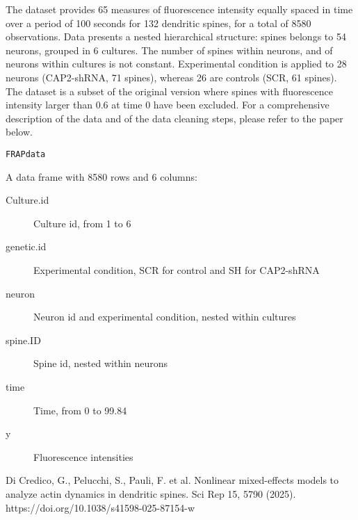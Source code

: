 \documentclass[a4paper]{book}
\begin{document}
%
\begin{Description}
The dataset provides 65 measures of fluorescence intensity equally spaced in time over a period of 100 seconds for 132 dendritic spines, for a total of 8580 observations.
Data presents a nested hierarchical structure: spines belongs to 54 neurons, grouped in 6 cultures.
The number of spines within neurons, and of neurons within cultures is not constant.
Experimental condition is applied to 28 neurons (CAP2-shRNA, 71 spines), whereas 26 are controls (SCR, 61 spines).
The dataset is a subset of the original version where spines with fluorescence intensity larger than 0.6 at time 0 have been excluded.
For a comprehensive description of the data and of the data cleaning steps, please refer to the paper below.
\end{Description}
%
\begin{Usage}
\begin{verbatim}
FRAPdata
\end{verbatim}
\end{Usage}
%
\begin{Format}
%
\begin{SubSection}{}

A data frame with 8580 rows and 6 columns:
\begin{description}

\item[Culture.id] Culture id, from 1 to 6
\item[genetic.id] Experimental condition, SCR for control and SH for CAP2-shRNA
\item[neuron] Neuron id and experimental condition, nested within cultures
\item[spine.ID] Spine id, nested within neurons
\item[time] Time, from 0 to 99.84
\item[y] Fluorescence intensities

\end{description}

\end{SubSection}

\end{Format}
%
\begin{Source}
Di Credico, G., Pelucchi, S., Pauli, F. et al. Nonlinear mixed-effects models to analyze actin dynamics in dendritic spines. Sci Rep 15, 5790 (2025). https://doi.org/10.1038/s41598-025-87154-w
\end{Source}
\end{document}
